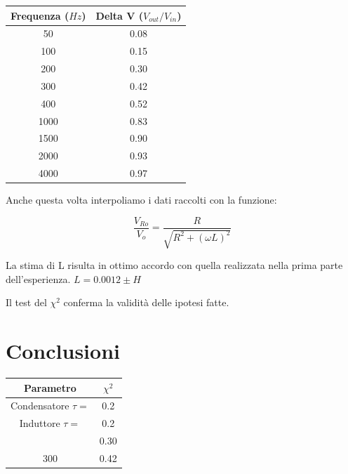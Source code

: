 \begin{center}
\begin{tabular}{*{2}{c}}
Frequenza ($Hz$) & Delta V ($V_{out}/V_{in}$) \\
\midrule
50 & 0.08 \\
100 & 0.15 \\
200 & 0.30 \\
300 & 0.42 \\
400 & 0.52 \\
1000 & 0.83 \\
1500 & 0.90 \\
2000 & 0.93 \\
4000 & 0.97 \\
\end{tabular}
\end{center}

Anche questa volta interpoliamo i dati raccolti con la funzione:

$$\frac{V_{Ro}}{V_o} = \frac{R}{\sqrt{R^2+(\omega L)^2}}$$

La stima di L risulta in ottimo accordo con quella realizzata nella prima parte dell'esperienza.
$L=0.0012 \pm H $

Il test del $\chi^2$ conferma la validità delle ipotesi fatte.

\section{Conclusioni}


\begin{center}
\begin{tabular}{*{2}{c}}
Parametro & $\chi^2$ \\
\midrule
Condensatore $\tau =$ & 0.2 \\
Induttore $\tau =$ & 0.2 \\
 & 0.30 \\
300 & 0.42 \\

\end{tabular}
\end{center}

